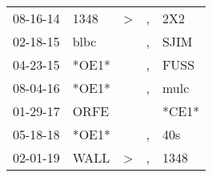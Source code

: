 \begin{supertabular}{p{0.07\textwidth}p{0.06\textwidth}p{0.02\textwidth}p{0.02\textwidth}p{0.06\textwidth}}
          08-16-14\textsuperscript{} &           1348\textsuperscript{} &     \textgreater &             , &            2X2\textsuperscript{} \\
          02-18-15\textsuperscript{} &           blbc\textsuperscript{} &                  &             , &           SJIM\textsuperscript{} \\
          04-23-15\textsuperscript{} &                            *OE1* &                  &             , &           FUSS\textsuperscript{} \\
          08-04-16\textsuperscript{} &                            *OE1* &                  &             , &           mulc\textsuperscript{} \\
          01-29-17\textsuperscript{} &           ORFE\textsuperscript{} &                  &               &                            *CE1* \\
          05-18-18\textsuperscript{} &                            *OE1* &                  &             , &            40s\textsuperscript{} \\
          02-01-19\textsuperscript{} &           WALL\textsuperscript{} &     \textgreater &             , &           1348\textsuperscript{} \\
\end{supertabular}
